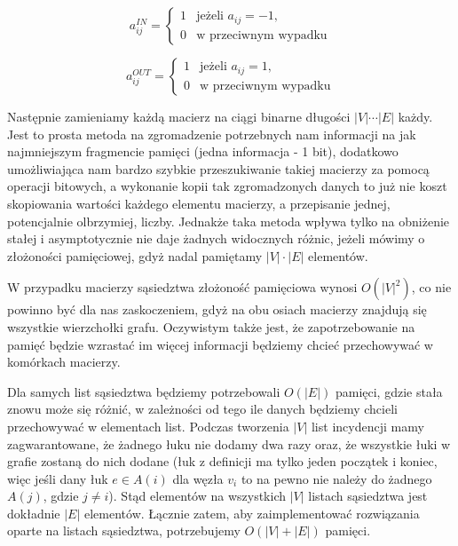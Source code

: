\begin{equation}
	a^{IN}_{ij}= \left\{ 
	\begin{array}{ll}
	1 & \textrm{jeżeli $a_{ij} = -1$,}\\
	0 & \textrm{w przeciwnym wypadku}
	\end{array} \right.
\end{equation}

\begin{equation}
	a^{OUT}_{ij}= \left\{ 
	\begin{array}{ll}
	1 & \textrm{jeżeli $a_{ij} = 1$,}\\
	0 & \textrm{w przeciwnym wypadku}
	\end{array} \right.
\end{equation}

Następnie zamieniamy każdą macierz na ciągi binarne długości $ \left| V \right| \cdots \left| E \right| $ każdy. Jest to prosta metoda na zgromadzenie potrzebnych nam informacji na jak najmniejszym fragmencie pamięci (jedna informacja - 1 bit), dodatkowo umożliwiająca nam bardzo szybkie przeszukiwanie takiej macierzy za pomocą operacji bitowych, a wykonanie kopii tak zgromadzonych danych to już nie koszt skopiowania wartości każdego elementu macierzy, a przepisanie jednej, potencjalnie olbrzymiej, liczby. Jednakże taka metoda wpływa tylko na obniżenie stałej i asymptotycznie nie daje żadnych widocznych różnic, jeżeli mówimy o złożoności pamięciowej, gdyż nadal pamiętamy $\left| V \right| \cdot \left| E \right|$ elementów.

W przypadku macierzy sąsiedztwa złożoność pamięciowa wynosi $O \left( \left| V \right| ^{2} \right) $, co nie powinno być dla nas zaskoczeniem, gdyż na obu osiach macierzy znajdują się wszystkie wierzchołki grafu. Oczywistym także jest, że zapotrzebowanie na pamięć będzie wzrastać im więcej informacji będziemy chcieć przechowywać w komórkach macierzy.

Dla samych list sąsiedztwa będziemy potrzebowali $O \left( \left| E \right| \right) $ pamięci, gdzie stała znowu może się różnić, w zależności od tego ile danych będziemy chcieli przechowywać w elementach list. Podczas tworzenia $ \left| V \right| $ list incydencji mamy zagwarantowane, że żadnego łuku nie dodamy dwa razy oraz, że wszystkie łuki w grafie zostaną do nich dodane (łuk z definicji ma tylko jeden początek i koniec, więc jeśli dany łuk $e \in A \left( i \right)$ dla węzła $v_{i}$ to na pewno nie należy do żadnego $A \left( j \right)$, gdzie $j \neq i$). Stąd elementów na wszystkich $ \left| V \right| $ listach sąsiedztwa jest dokładnie $ \left| E \right| $ elementów. Łącznie zatem, aby zaimplementować rozwiązania oparte na listach sąsiedztwa, potrzebujemy $ O \left( \left| V \right| + \left| E \right| \right)$ pamięci.

